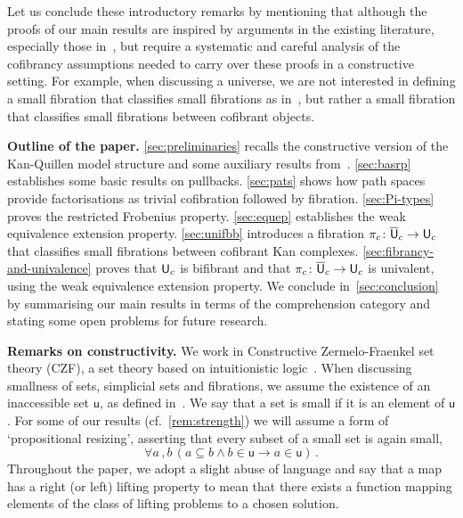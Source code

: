 \documentclass[reqno,10pt,a4paper,oneside,draft]{amsart}
\begin{document}
Let us conclude these introductory remarks by mentioning that 
although the proofs of our main results are inspired by arguments  in the existing literature, especially those in~\cite{voevodsky-simplicial-model}, but require a systematic
and careful analysis of the cofibrancy assumptions needed to carry over these proofs in a constructive
setting. For example,
when discussing a universe, we are not interested in defining a small fibration that classifies small fibrations as in~\cite{voevodsky-simplicial-model}, but
rather a small fibration that classifies small fibrations between cofibrant objects. 


\smallskip

\noindent 
\textbf{Outline of the paper.} \cref{sec:preliminaries} recalls the constructive version of the 
Kan-Quillen model structure and some auxiliary results from~\cite{henry2019qms}. \cref{sec:basrp} establishes some basic results on pullbacks. \cref{sec:pats} shows how path spaces provide factorisations
as trivial cofibration followed by fibration. \cref{sec:Pi-types} proves the restricted Frobenius property. \cref{sec:equep}
establishes the weak equivalence extension property.
\cref{sec:unifbb} introduces a fibration $\pi_c \colon \overline{\mathsf{U}}_c \to \mathsf{U}_c$ that classifies small fibrations
between cofibrant Kan complexes. \cref{sec:fibrancy-and-univalence} proves that $\mathsf{U}_c$ is bifibrant and that $\pi_c \colon \overline{\mathsf{U}}_c \to \mathsf{U}_c$ is univalent, using the weak equivalence extension property.
We conclude in~\cref{sec:conclusion} by summarising our main results in terms of
the comprehension category and stating some open problems for future research.

\smallskip

\noindent
\textbf{Remarks on constructivity.} We work in  Constructive Zermelo-Fraenkel set theory (CZF),
a set theory based on intuitionistic logic~\cite{AczelP:typtic-I}. When discussing smallness of sets,
simplicial sets and fibrations, we assume the existence of an inaccessible set $\mathsf{u}$, as defined 
in~\cite[Definition~18.1.2]{AczelP:notcst}. We say that a set is small if it is an element of $\mathsf{u}$.
For some of our results (cf.~\cref{rem:strength}) we will assume a form of `propositional resizing', asserting that every subset 
of a small set is again small, \ie 
\[
\forall a \, , b \,  ( a \subseteq b \land b \in \mathsf{u} \rightarrow a \in \mathsf{u} ) \, . 
\]
Throughout the paper, we adopt a slight abuse of language and say that a map has a right (or left) lifting property to mean that there exists a function mapping elements of the class of lifting problems to a chosen solution. 
\end{document}
